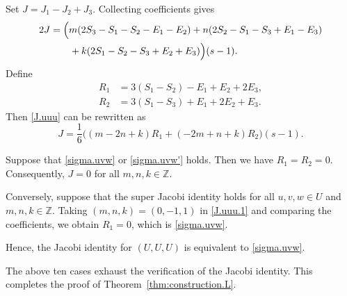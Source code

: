 \documentclass[12pt]{article}
\numberwithin{equation}{section}
\theoremstyle{definition}
\theoremstyle{plain}
\newcommand{\bZ}{\ensuremath{\mathbb{Z}}}
\begin{document}
Set $J=J_1-J_2+J_3$. Collecting coefficients gives
\begin{align}
    2J&=\Big(m(2S_3-S_1-S_2-E_1-E_2)+n(2S_2-S_1-S_3+E_1-E_3)\notag\\
    &\qquad+k(2S_1-S_2-S_3+E_2+E_3)
      \Big)(s-1).\label{J.uuu}
\end{align}
Define
\begin{align*}
    R_1&=3(S_1-S_2)-E_1+E_2+2E_3,\\
    R_2&=3(S_1-S_3)+E_1+2E_2+E_3.
\end{align*}
Then \eqref{J.uuu} can be rewritten as
\begin{equation}\label{J.uuu.1}
    J=\frac16\Big((m-2n+k)R_1+(-2m+n+k)R_2\Big)(s-1).
\end{equation}

Suppose that \eqref{sigma.uvw} or \eqref{sigma.uvw'} holds. Then we have $R_1=R_2=0$. Consequently, $J=0$ for all $m,n,k\in\bZ$.

Conversely, suppose that the super Jacobi identity holds for all $u,v,w\in U$ and $m,n,k\in\bZ$. Taking $(m,n,k)=(0,-1,1)$ in \eqref{J.uuu.1} and comparing the coefficients, we obtain $R_1=0$, which is \eqref{sigma.uvw}.

Hence, the Jacobi identity for $(U,U,U)$ is equivalent to \eqref{sigma.uvw}.

The above ten cases exhaust the verification of the Jacobi identity. This completes the proof of Theorem~\ref{thm:construction.L}.
\end{document}
